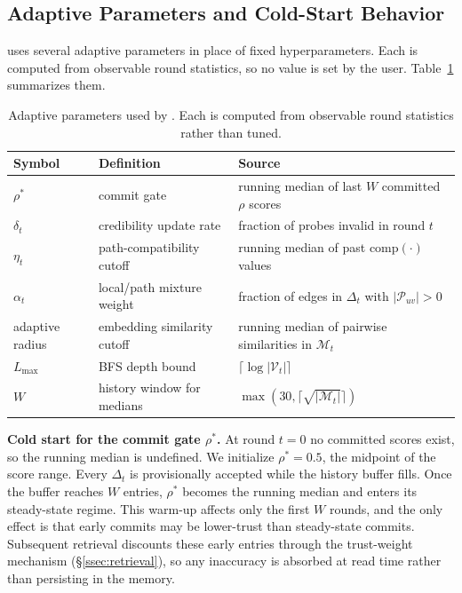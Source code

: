 \subsection{Adaptive Parameters and Cold-Start Behavior}
\label{app:adaptive_params}

\system uses several adaptive parameters in place of fixed
hyperparameters. Each is computed from observable round statistics,
so no value is set by the user. Table~\ref{tab:adaptive_params}
summarizes them.

\begin{table}[h]
\caption{Adaptive parameters used by \system. Each is computed from
observable round statistics rather than tuned.}
\centering
\small
\begin{tabular}{lll}
\toprule
\textbf{Symbol} & \textbf{Definition} & \textbf{Source} \\
\midrule
$\rho^*$ & commit gate & running median of last $W$ committed
$\rho$ scores \\
$\delta_t$ & credibility update rate & fraction of probes invalid in
round $t$ \\
$\eta_t$ & path-compatibility cutoff & running median of past
$\text{comp}(\cdot)$ values \\
$\alpha_t$ & local/path mixture weight & fraction of edges in
$\Delta_t$ with $|\mathcal{P}_{uv}| > 0$ \\
adaptive radius & embedding similarity cutoff & running median of
pairwise similarities in $\mathcal{M}_t$ \\
$L_{\max}$ & BFS depth bound & $\lceil \log |\mathcal{V}_t| \rceil$ \\
$W$ & history window for medians & $\max(30, \lceil \sqrt{|\mathcal{M}_t|}
\rceil)$ \\
\bottomrule
\end{tabular}
\label{tab:adaptive_params}
\end{table}

\textbf{Cold start for the commit gate $\rho^*$.}
\label{app:rho_star}
At round $t=0$ no committed scores exist, so the running median is
undefined. We initialize $\rho^* = 0.5$, the midpoint of the score
range. Every $\Delta_t$ is provisionally accepted while the history
buffer fills. Once the buffer reaches $W$ entries, $\rho^*$ becomes
the running median and \system enters its steady-state regime. This
warm-up affects only the first $W$ rounds, and the only effect is
that early commits may be lower-trust than steady-state commits.
Subsequent retrieval discounts these early entries through the
trust-weight mechanism (\S\ref{ssec:retrieval}), so any inaccuracy is
absorbed at read time rather than persisting in the memory.

